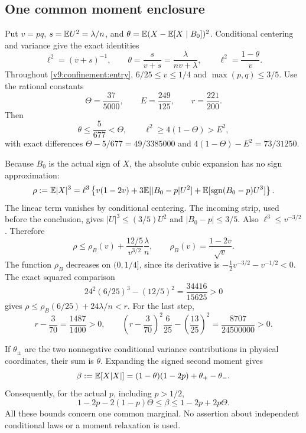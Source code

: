 \subsection{One common moment enclosure}
Put $v=pq$, $s=\mathbb E U^2=\lambda/n$, and
$\theta=\mathbb E(X-\mathbb E[X\mid B_0])^2$. Conditional centering and variance
give the exact identities
\begin{equation}\label{v9:confinement:identities}
 \ell^2=(v+s)^{-1},\qquad
 \theta=\frac{s}{v+s}=\frac{\lambda}{nv+\lambda},\qquad
 \ell^2=\frac{1-\theta}{v}.
\end{equation}
Throughout \eqref{v9:confinement:entry}, $6/25\le v\le1/4$ and
$\max(p,q)\le3/5$. Use the rational constants
\[
 \Theta=\frac{37}{5000},\qquad E=\frac{249}{125},\qquad
 r=\frac{221}{200}.
\]
Then
\[
 \theta\le\frac{5}{677}<\Theta,\qquad
 \ell^2\ge4(1-\Theta)>E^2,
\]
with exact differences
$\Theta-5/677=49/3385000$ and $4(1-\Theta)-E^2=73/31250$.

Because $B_0$ is the actual sign of $X$, the absolute cubic
expansion has no sign approximation:
\begin{equation}\label{v9:confinement:cubic}
 \rho:=\mathbb E|X|^3=\ell^3\left\{v(1-2v)
       +3\mathbb E[|B_0-p|U^2]
       +\mathbb E[\operatorname{sgn}(B_0-p)U^3]\right\}.
\end{equation}
The linear term vanishes by conditional centering. The incoming strip,
used before the conclusion, gives $|U|^3\le(3/5)U^2$ and
$|B_0-p|\le3/5$. Also $\ell^3\le v^{-3/2}$. Therefore
\[
 \rho\le\rho_B(v)+\frac{12/5}{v^{3/2}}\frac\lambda n,
 \qquad \rho_B(v)=\frac{1-2v}{\sqrt v}.
\]
The function $\rho_B$ decreases on $(0,1/4]$, since its derivative is
$-\tfrac12v^{-3/2}-v^{-1/2}<0$. The exact squared comparison
\[
 24^2(6/25)^3-(12/5)^2=\frac{34416}{15625}>0
\]
gives $\rho\le\rho_B(6/25)+24\lambda/n<r$. For the last step,
\[
 r-\frac3{70}=\frac{1487}{1400}>0,\qquad
 \left(r-\frac3{70}\right)^2\frac6{25}
       -\left(\frac{13}{25}\right)^2=\frac{8707}{24500000}>0.
\]

If $\theta_\pm$ are the two nonnegative conditional variance contributions
in physical coordinates, their sum is $\theta$. Expanding the signed
second moment gives
\[
 \beta:=\mathbb E[X|X|]=(1-\theta)(1-2p)+\theta_+-\theta_-.
\]
Consequently, for the actual $p$, including $p>1/2$,
\begin{equation}\label{v9:confinement:beta}
 1-2p-2(1-p)\Theta\le\beta\le1-2p+2p\Theta.
\end{equation}
All these bounds concern one common marginal. No assertion about
independent conditional laws or a moment relaxation is used.

